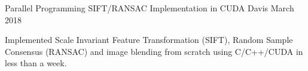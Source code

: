 


\begin{cventries}



\cventry
{Parallel Programming} %
{SIFT/RANSAC Implementation in CUDA} %
{Davis} %
{March 2018} %
{ %
\begin{cvitems}
\item {Implemented Scale Invariant Feature Transformation (SIFT), Random Sample Consensus (RANSAC) and image blending from scratch using C/C++/CUDA in less than a week.}
\end{cvitems}
}


\end{cventries}
